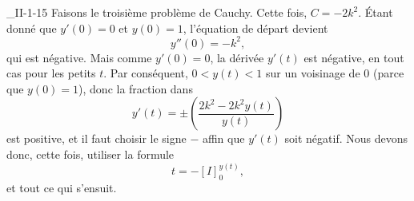 \begin{corrige}{_II-1-15}
Faisons le troisième problème de Cauchy. Cette fois, $C=-2k^2$. Étant donné que $y'(0)=0$ et $y(0)=1$, l'équation de départ devient 
\begin{equation}
	y''(0)=-k^2,
\end{equation}
qui est négative. Mais comme $y'(0)=0$, la dérivée $y'(t)$ est négative, en tout cas pour les petits $t$. Par conséquent, $0<y(t)<1$ sur un voisinage de $0$ (parce que $y(0)=1$), donc la fraction dans
\begin{equation}
	y'(t)=\pm\left( \frac{ 2k^2-2k^2y(t) }{ y(t) } \right)
\end{equation}
est positive, et il faut choisir le signe $-$ affin que $y'(t)$ soit négatif. Nous devons donc, cette fois, utiliser la formule
\begin{equation}
	t=-[I]_0^{y(t)},
\end{equation}
 et tout ce qui s'ensuit.


\end{corrige}
